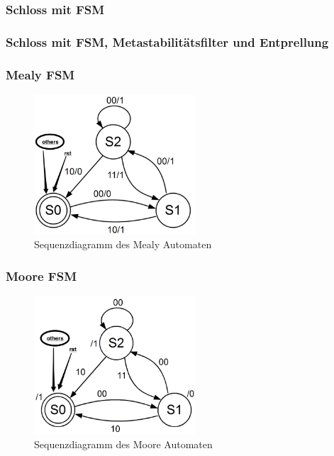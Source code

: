 \subsubsection{Schloss mit FSM}


\subsubsection{Schloss mit FSM, Metastabilitätsfilter und Entprellung}


\subsubsection{Mealy FSM}


\begin{figure}[htbp]
	\centering
		\includegraphics[width=6cm]{content/bilder/fsm_mealy.png}
	\caption{Sequenzdiagramm des Mealy Automaten}%
	\label{Mealy}
\end{figure}

\subsubsection{Moore FSM}


\begin{figure}[htbp]
	\centering
		\includegraphics[width=6cm]{content/bilder/fsm_moore.png}
	\caption{Sequenzdiagramm des Moore Automaten}%
	\label{Moore}
\end{figure}
